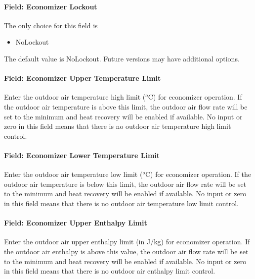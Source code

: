 \paragraph{Field: Economizer Lockout}\label{field-economizer-lockout-5}

The only choice for this field is

\begin{itemize}
\tightlist
\item
  NoLockout
\end{itemize}

The default value is NoLockout. Future versions may have additional options.

\paragraph{Field: Economizer Upper Temperature Limit}\label{field-economizer-upper-temperature-limit-3}

Enter the outdoor air temperature high limit (\(^{o}\)C) for economizer operation. If the outdoor air temperature is above this limit, the outdoor air flow rate will be set to the minimum and heat recovery will be enabled if available. No input or zero in this field means that there is no outdoor air temperature high limit control.

\paragraph{Field: Economizer Lower Temperature Limit}\label{field-economizer-lower-temperature-limit-3}

Enter the outdoor air temperature low limit (\(^{o}\)C) for economizer operation. If the outdoor air temperature is below this limit, the outdoor air flow rate will be set to the minimum and heat recovery will be enabled if available. No input or zero in this field means that there is no outdoor air temperature low limit control.

\paragraph{Field: Economizer Upper Enthalpy Limit}\label{field-economizer-upper-enthalpy-limit-3}

Enter the outdoor air upper enthalpy limit (in J/kg) for economizer operation. If the outdoor air enthalpy is above this value, the outdoor air flow rate will be set to the minimum and heat recovery will be enabled if available. No input or zero in this field means that there is no outdoor air enthalpy limit control.

